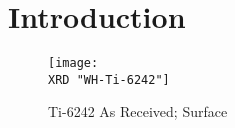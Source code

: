 \chapter{Introduction}
\begin{figure}[H]
    \centering
        \texttt{[image: \\XRD "WH-Ti-6242"]}
        \caption{Ti-6242 As Received; Surface}
    \label{fig:EDM-Cut}
\end{figure}

